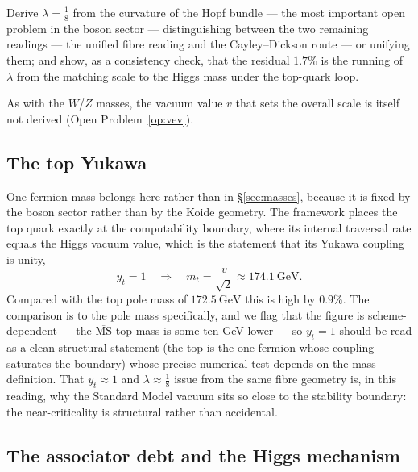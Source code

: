 \begin{openproblem}\label{op:higgs-lambda}
Derive $\lambda = \tfrac18$ from the curvature of the Hopf bundle --- the most important open
problem in the boson sector --- distinguishing between the two remaining readings --- the unified fibre reading and the
Cayley--Dickson route --- or unifying them;
and show, as a consistency check, that the residual $1.7\%$ is the running of $\lambda$ from the
matching scale to the Higgs mass under the top-quark loop.
\end{openproblem}

As with the $W$/$Z$ masses, the vacuum value $v$ that sets the overall scale is itself not derived
(Open Problem~\ref{op:vev}).

\subsection{The top Yukawa}

One fermion mass belongs here rather than in \S\ref{sec:masses}, because it is fixed by the boson
sector rather than by the Koide geometry. The framework places the top quark exactly at the
computability boundary, where its internal traversal rate equals the Higgs vacuum value, which is the
statement that its Yukawa coupling is unity,
\begin{equation}
  y_t = 1 \quad\Longrightarrow\quad m_t = \frac{v}{\sqrt2} \approx 174.1\ \mathrm{GeV}.
\end{equation}
Compared with the top pole mass of $172.5\ \mathrm{GeV}$ this is high by $0.9\%$. The comparison is
to the pole mass specifically, and we flag that the figure is scheme-dependent --- the
$\overline{\mathrm{MS}}$ top mass is some ten GeV lower --- so $y_t = 1$ should be read as a clean
structural statement (the top is the one fermion whose coupling saturates the boundary) whose precise
numerical test depends on the mass definition. That $y_t \approx 1$ and $\lambda \approx \tfrac18$
issue from the same fibre geometry is, in this reading, why the Standard Model vacuum sits so close to
the stability boundary: the near-criticality is structural rather than accidental.

\subsection{The associator debt and the Higgs mechanism}
\label{sec:associator-higgs}

